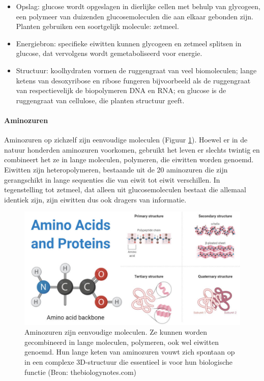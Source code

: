 \documentclass[
  11pt,
]{book}
\begin{document}
\begin{itemize}
\item
  Opslag: glucose wordt opgeslagen in dierlijke cellen met behulp van glycogeen, een polymeer van duizenden glucosemoleculen die aan elkaar gebonden zijn. Planten gebruiken een soortgelijk molecule: zetmeel.
\item
  Energiebron: specifieke eiwitten kunnen glycogeen en zetmeel splitsen in glucose, dat vervolgens wordt gemetaboliseerd voor energie.
\item
  Structuur: koolhydraten vormen de ruggengraat van veel biomoleculen; lange ketens van desoxyribose en ribose fungeren bijvoorbeeld als de ruggengraat van respectievelijk de biopolymeren DNA en RNA; en glucose is de ruggengraat van cellulose, die planten structuur geeft.
\end{itemize}

\pagebreak

\hypertarget{sectionAminoAcids}{%
\paragraph{Aminozuren}\label{sectionAminoAcids}}

Aminozuren op zichzelf zijn eenvoudige moleculen (Figuur \ref{fig:aminoAcids}).
Hoewel er in de natuur honderden aminozuren voorkomen, gebruikt het leven er slechts twintig en combineert het ze in lange moleculen, polymeren, die eiwitten worden genoemd. Eiwitten zijn heteropolymeren, bestaande uit de 20 aminozuren die zijn gerangschikt in lange sequenties die van eiwit tot eiwit verschillen. In tegenstelling tot zetmeel, dat alleen uit glucosemoleculen bestaat die allemaal identiek zijn, zijn eiwitten dus ook dragers van informatie.



\begin{figure}

{\centering \includegraphics[width=1\linewidth]{./figs/Amino-acids-and-Proteins} 

}

\caption{Aminozuren zijn eenvoudige moleculen. Ze kunnen worden gecombineerd in lange moleculen, polymeren, ook wel eiwitten genoemd. Hun lange keten van aminozuren vouwt zich spontaan op in een complexe 3D-structuur die essentieel is voor hun biologische functie (Bron: thebiologynotes.com)}\label{fig:aminoAcids}
\end{figure}
\end{document}
